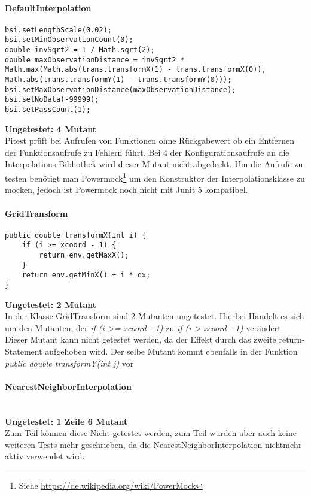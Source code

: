 \paragraph{DefaultInterpolation}
\begin{lstlisting}[style=customjava]
bsi.setLengthScale(0.02);
bsi.setMinObservationCount(0);
double invSqrt2 = 1 / Math.sqrt(2);
double maxObservationDistance = invSqrt2 * Math.max(Math.abs(trans.transformX(1) - trans.transformX(0)), Math.abs(trans.transformY(1) - trans.transformY(0)));
bsi.setMaxObservationDistance(maxObservationDistance);
bsi.setNoData(-99999);
bsi.setPassCount(1);
\end{lstlisting}
\textbf{Ungetestet: 4 Mutant}
\\
Pitest prüft bei Aufrufen von Funktionen ohne Rückgabewert ob ein Entfernen der Funktionsaufrufe zu Fehlern führt.
Bei 4 der Konfigurationsaufrufe an die Interpolations-Bibliothek wird dieser Mutant nicht abgedeckt.
Um die Aufrufe zu testen benötigt man Powermock\footnote{Siehe \url{https://de.wikipedia.org/wiki/PowerMock}} um den Konstruktor der Interpolationsklasse zu mocken, jedoch ist Powermock noch nicht mit Junit 5 kompatibel.

\paragraph{GridTransform}
\begin{lstlisting}[style=customjava]
public double transformX(int i) {
    if (i >= xcoord - 1) {
        return env.getMaxX();
    }
    return env.getMinX() + i * dx;
}
\end{lstlisting}
\textbf{Ungetestet: 2 Mutant}
\\
In der Klasse GridTransform sind 2 Mutanten ungetestet.
Hierbei Handelt es sich um den Mutanten, der \textit{if (i >= xcoord - 1)} zu \textit{if (i > xcoord - 1)} verändert.
Dieser Mutant kann nicht getestet werden, da der Effekt durch das zweite return-Statement aufgehoben wird.
Der selbe Mutant kommt ebenfalls in der Funktion \textit{public double transformY(int j)} vor

\paragraph{NearestNeighborInterpolation}
\mbox{}\\
\textbf{Ungetestet: 1 Zeile 6 Mutant}
\\
Zum Teil können diese Nicht getestet werden, zum Teil wurden aber auch keine weiteren Tests mehr geschrieben, da die NearestNeighborInterpolation nichtmehr aktiv verwendet wird.